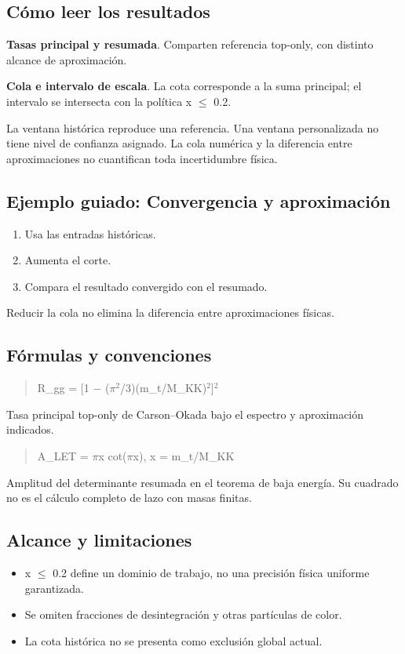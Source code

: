 \documentclass[11pt,a4paper]{article}
\begin{document}
\subsection*{Cómo leer los resultados}
\textbf{Tasas principal y resumada}. Comparten referencia top-only, con distinto alcance de aproximación.

\textbf{Cola e intervalo de escala}. La cota corresponde a la suma principal; el intervalo se intersecta con la política x \ensuremath{\leq} 0.2.

La ventana histórica reproduce una referencia. Una ventana personalizada no tiene nivel de confianza asignado. La cola numérica y la diferencia entre aproximaciones no cuantifican toda incertidumbre física.
\subsection*{Ejemplo guiado: Convergencia y aproximación}
\begin{enumerate}
\item Usa las entradas históricas.
\item Aumenta el corte.
\item Compara el resultado convergido con el resumado.
\end{enumerate}
Reducir la cola no elimina la diferencia entre aproximaciones físicas.
\subsection*{Fórmulas y convenciones}
\begin{quote}R\_gg = [1 \ensuremath{-} (\ensuremath{\pi}\ensuremath{{}^{2}}/3)(m\_t/M\_KK)\ensuremath{{}^{2}}]\ensuremath{{}^{2}}\end{quote}
Tasa principal top-only de Carson--Okada bajo el espectro y aproximación indicados.

\begin{quote}A\_LET = \ensuremath{\pi}x cot(\ensuremath{\pi}x),  x = m\_t/M\_KK\end{quote}
Amplitud del determinante resumada en el teorema de baja energía. Su cuadrado no es el cálculo completo de lazo con masas finitas.

\subsection*{Alcance y limitaciones}
\begin{itemize}
\item x \ensuremath{\leq} 0.2 define un dominio de trabajo, no una precisión física uniforme garantizada.
\item Se omiten fracciones de desintegración y otras partículas de color.
\item La cota histórica no se presenta como exclusión global actual.
\end{itemize}
\end{document}
